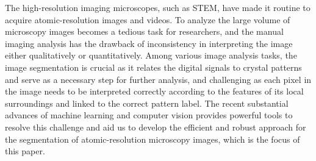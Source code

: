 \documentclass[twocolumn,amsmath, floatfix]{revtex4}
\begin{document}
The high-resolution imaging microscopes, such as STEM, have made it routine to acquire atomic-resolution images and videos. To analyze the large volume of microscopy images becomes a tedious task for researchers, and the manual imaging analysis has the drawback of inconsistency in interpreting the image either qualitatively or quantitatively. Among various image analysis tasks, the image segmentation is crucial as it relates the digital signals to crystal patterns and serve as a necessary step for further analysis, and challenging as each pixel in the image needs to be interpreted correctly according to the features of its local surroundings and linked to the correct pattern label.  The recent substantial advances of machine learning and computer vision provides powerful tools to resolve this challenge and aid us to develop the efficient and robust approach for the segmentation of atomic-resolution microscopy images, which is the focus of this paper.
\end{document}
